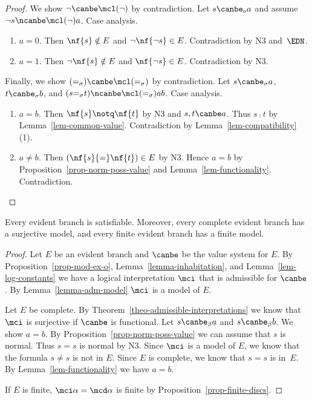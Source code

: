 \begin{proof}
  We show $\neg\canbe \mcl(\neg)$ by contradiction.
  Let $s\canbe_oa$ and assume $\neg s \ncanbe\mcl(\neg) a$. Case analysis.
  \begin{enumerate}[$\bullet$]
  \item $a=0$.  Then $\nf{s}\notin
    E$ and $\neg\nf{\neg s}\in E$.  Contradiction
    by N3 and~$\EDN$.
  \item $a=1$.  Then $\neg\nf{s}\notin E$ and $\nf{\neg s}\in E$.
    Contradiction by N3.
  \end{enumerate}
Finally, we show $(=_\sigma)\canbe\mcl(=_\sigma)$ by
  contradiction.  Let $s\canbe_\sigma a$,
  $t\canbe_\sigma b$, and
  $(s{=_\sigma}t)\ncanbe\mcl(=_\sigma)ab$.  Case analysis.
  \begin{enumerate}[$\bullet$]
  \item $a=b$.  Then $\nf{s}\notq\nf{t}$ by N3 and
    $s,t\canbe a$.  Thus $s\comp t$ by
    Lemma~\ref{lem-common-value}.  Contradiction by
    Lemma~\ref{lem-compatibility}\,(1).
  \item $a\neq b$.  Then $(\nf{s}{=}\nf{t})\in E$ by
    N3. Hence $a=b$ by
    Proposition~\ref{prop-norm-poss-value}
    and Lemma~\ref{lem-functionality}.  Contradiction.\qedhere
  \end{enumerate}
\end{proof}

\begin{thm}
  \label{theo-model-exist}
  Every evident branch is satisfiable.  Moreover, every
  complete evident branch has a surjective model, and
  every finite evident branch has a finite model.
\end{thm}

\begin{proof}
  Let $E$ be an evident branch and $\canbe$ be the
  value system for $E$.  By
  Proposition~\ref{prop-mod-ex-o},
  Lemma~\ref{lemma-inhabitation}, and
  Lemma~\ref{lem-log-constants} we have a logical
  interpretation $\mci$ that is admissible for
  $\canbe$.  By Lemma~\ref{lemma-adm-model} $\mci$ is a
  model of $E$.  

  Let $E$ be complete.  By
  Theorem~\ref{theo-admissible-interpretations} we know
  that $\mci$ is surjective if $\canbe$ is functional.
  Let $s\canbe_\beta a$ and $s\canbe_\beta b$.  We show
  $a=b$.  By Proposition~\ref{prop-norm-poss-value} we
  can assume that $s$ is normal.  Thus $s{=}s$ is
  normal by N3. Since $\mci$ is a model of $E$, we know
  that the formula $s{\neq}s$ is not in $E$.  Since $E$
  is complete, we know that ${s}{=}{s}$ is
  in~$E$.  By Lemma~\ref{lem-functionality} we have
  $a=b$.

  If $E$ is finite, $\mci\alpha=\mcd\alpha$ is finite
  by Proposition~\ref{prop-finite-discs}.
\end{proof}

